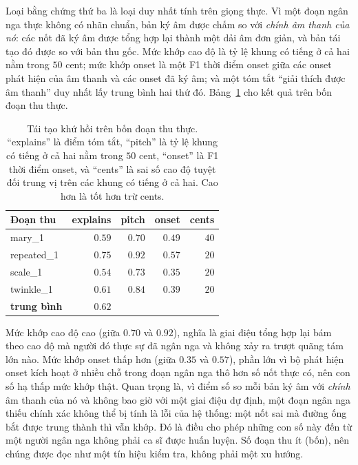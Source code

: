 \documentclass[12pt,a4paper]{article}
\begin{document}
Loại bằng chứng thứ ba là loại duy nhất tính trên giọng thực. Vì một đoạn ngân nga
thực không có nhãn chuẩn, bản ký âm được chấm so với \emph{chính âm thanh của nó}:
các nốt đã ký âm được tổng hợp lại thành một dải âm đơn giản, và bản tái tạo đó được
so với bản thu gốc. Mức khớp cao độ là tỷ lệ khung có tiếng ở cả hai nằm trong $50$
cent; mức khớp onset là một F1 thời điểm onset giữa các onset phát hiện của âm thanh
và các onset đã ký âm; và một tóm tắt ``giải thích được âm thanh'' duy nhất lấy
trung bình hai thứ đó. Bảng~\ref{tab:roundtrip} cho kết quả trên bốn đoạn thu thực.

\begin{table}[H]
\centering
\caption{Tái tạo khứ hồi trên bốn đoạn thu thực. ``explains'' là điểm tóm tắt,
``pitch'' là tỷ lệ khung có tiếng ở cả hai nằm trong $50$ cent, ``onset'' là F1
thời điểm onset, và ``cents'' là sai số cao độ tuyệt đối trung vị trên các khung có
tiếng ở cả hai. Cao hơn là tốt hơn trừ cents.}
\label{tab:roundtrip}
\begin{tabular}{l r r r r}
\toprule
\textbf{Đoạn thu} & \textbf{explains} & \textbf{pitch} & \textbf{onset} &
\textbf{cents} \\
\midrule
mary\_1     & $0.59$ & $0.70$ & $0.49$ & $40$ \\
repeated\_1 & $0.75$ & $0.92$ & $0.57$ & $20$ \\
scale\_1    & $0.54$ & $0.73$ & $0.35$ & $20$ \\
twinkle\_1  & $0.61$ & $0.84$ & $0.39$ & $20$ \\
\midrule
\textbf{trung bình} & $\mathbf{0.62}$ & & & \\
\bottomrule
\end{tabular}
\end{table}

Mức khớp cao độ cao (giữa $0.70$ và $0.92$), nghĩa là giai điệu tổng hợp lại bám
theo cao độ mà người đó thực sự đã ngân nga và không xảy ra trượt quãng tám lớn nào.
Mức khớp onset thấp hơn (giữa $0.35$ và $0.57$), phần lớn vì bộ phát hiện onset kích
hoạt ở nhiều chỗ trong đoạn ngân nga thô hơn số nốt thực có, nên con số hạ thấp mức
khớp thật. Quan trọng là, vì điểm số so mỗi bản ký âm với \emph{chính} âm thanh của
nó và không bao giờ với một giai điệu dự định, một đoạn ngân nga thiếu chính xác
không thể bị tính là lỗi của hệ thống: một nốt sai mà đường ống bắt được trung thành
thì vẫn khớp. Đó là điều cho phép những con số này đến từ một người ngân nga không
phải ca sĩ được huấn luyện. Số đoạn thu ít (bốn), nên chúng được đọc như một tín
hiệu kiểm tra, không phải một xu hướng.
\end{document}

